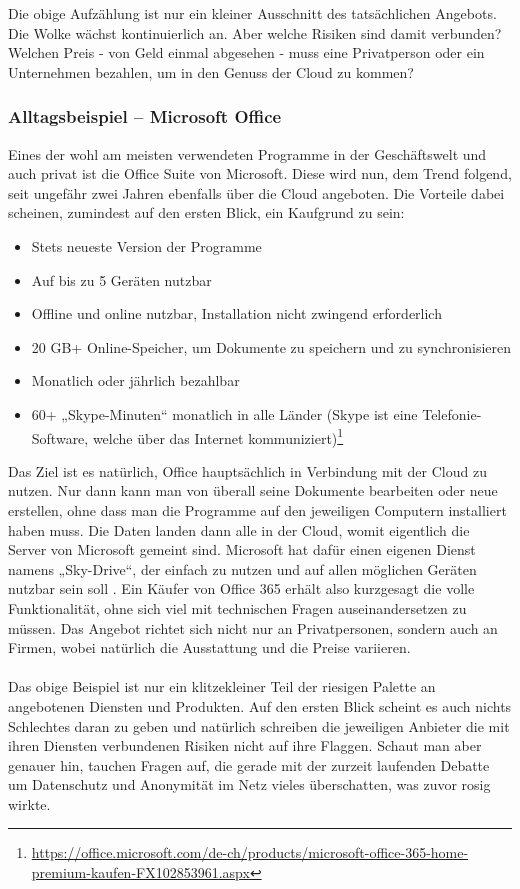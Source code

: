 Die obige Aufzählung ist nur ein kleiner Ausschnitt des tatsächlichen Angebots. Die Wolke wächst kontinuierlich an. Aber welche Risiken sind damit verbunden? Welchen Preis - von Geld einmal abgesehen - muss eine Privatperson oder ein Unternehmen bezahlen, um in den Genuss der Cloud zu kommen?

\subsubsection{Alltagsbeispiel – Microsoft Office}
Eines der wohl am meisten verwendeten Programme in der Geschäftswelt und auch privat ist die Office Suite von Microsoft. Diese wird nun, dem Trend folgend, seit ungefähr zwei Jahren ebenfalls über die Cloud angeboten. Die Vorteile dabei scheinen, zumindest auf den ersten Blick, ein Kaufgrund zu sein:

\begin{itemize}
\item Stets neueste Version der Programme
\item Auf bis zu 5 Geräten nutzbar
\item Offline und online nutzbar, Installation nicht zwingend erforderlich
\item 20 GB+ Online-Speicher, um Dokumente zu speichern und zu synchronisieren
\item Monatlich oder jährlich bezahlbar
\item 60+ „Skype-Minuten“ monatlich in alle Länder (Skype ist eine Telefonie-Software, welche über das Internet kommuniziert)\footnote{\url{https://office.microsoft.com/de-ch/products/microsoft-office-365-home-premium-kaufen-FX102853961.aspx}}
\end{itemize}

Das Ziel ist es natürlich, Office hauptsächlich in Verbindung mit der Cloud zu nutzen. Nur dann kann man von überall seine Dokumente bearbeiten oder neue erstellen, ohne dass man die Programme auf den jeweiligen Computern installiert haben muss. Die Daten landen dann alle in der Cloud, womit eigentlich die Server von Microsoft gemeint sind. Microsoft hat dafür einen eigenen Dienst namens „Sky-Drive“, der einfach zu nutzen und auf allen möglichen Geräten nutzbar sein soll . Ein Käufer von Office 365 erhält also kurzgesagt die volle Funktionalität, ohne sich viel mit technischen Fragen auseinandersetzen zu müssen.
Das Angebot richtet sich nicht nur an Privatpersonen, sondern auch an Firmen, wobei natürlich die Ausstattung und die Preise variieren.
\\
\\
Das obige Beispiel ist nur ein klitzekleiner Teil der riesigen Palette an angebotenen Diensten und Produkten. Auf den ersten Blick scheint es auch nichts Schlechtes daran zu geben und natürlich schreiben die jeweiligen Anbieter die mit ihren Diensten verbundenen Risiken nicht auf ihre Flaggen. Schaut man aber genauer hin, tauchen Fragen auf, die gerade mit der zurzeit laufenden Debatte um Datenschutz und Anonymität im Netz vieles überschatten, was zuvor rosig wirkte.

